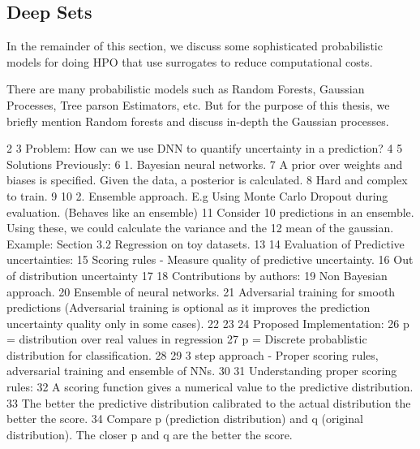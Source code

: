 \documentclass[11pt]{report}
\begin{document}
\subsection{Deep Sets}



In the remainder of this section, we discuss some sophisticated probabilistic models for doing HPO that use surrogates to reduce computational costs.



There are many probabilistic models such as Random Forests, Gaussian Processes, Tree parson Estimators, etc.
But for the purpose of this thesis, we briefly mention Random forests and discuss in-depth the Gaussian processes.


\iffalse
  2 
  3 Problem: How can we use DNN to quantify uncertainty in a prediction?
  4 
  5 Solutions Previously:
  6     1. Bayesian neural networks.
  7        A prior over weights and biases is specified. Given the data, a posterior is calculated.
  8        Hard and complex to train.
  9 
 10     2. Ensemble approach. E.g Using Monte Carlo Dropout during evaluation. (Behaves like an ensemble)
 11        Consider 10 predictions in an ensemble. Using these, we could calculate the variance and the
 12        mean of the gaussian. Example: Section 3.2 Regression on toy datasets.
 13 
 14 Evaluation of Predictive uncertainties:
 15     Scoring rules - Measure quality of predictive uncertainty.
 16     Out of distribution uncertainty
 17 
 18 Contributions by authors:
 19     Non Bayesian approach.
 20     Ensemble of neural networks.
 21     Adversarial training for smooth predictions (Adversarial training is optional as it improves the prediction uncertainty quality only     in some cases).
 22 
 23 
 24 Proposed Implementation:
 26     p = distribution over real values in regression
 27     p = Discrete probablistic distribution for classification.
 28 
 29     3 step approach - Proper scoring rules, adversarial training and ensemble of NNs.
 30 
 31 Understanding proper scoring rules:
 32     A scoring function gives a numerical value to the predictive distribution.
 33     The better the predictive distribution calibrated to the actual distribution the better the score.
 34     Compare p (prediction distribution) and q (original distribution). The closer p and q are the better the score.
 
\end{document}
